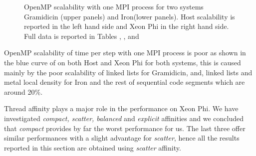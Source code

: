 \begin{figure}[!ht]
\caption{OpenMP scalability with one MPI process for two systems Gramidicin (upper panels) and Iron(lower panels).          
  Host scalability is reported in the left hand side and Xeon Phi in the right hand side. Full data is reported 
  in Tables , ,  and }
\label{fig:mpi1}
\end{figure}

\par{OpenMP scalability of time per step with one MPI process is poor as shown in the blue curve of  on both Host 
and Xeon Phi for both systems, this is caused mainly by the poor scalability of linked lists for Gramidicin, and, linked lists and 
metal local density for Iron and the rest of sequential code segments which are around 20\%.}

\par{Thread affinity plays a major role in the performance on Xeon Phi. We have investigated \emph{compact, scatter,
balanced} and \emph{explicit} affinities and we concluded that \emph{compact} provides by far the worst performance for us. 
The last three offer similar performances with a slight advantage for \emph{scatter}, hence all the results reported
in this section are obtained using \emph{scatter} affinity.}


